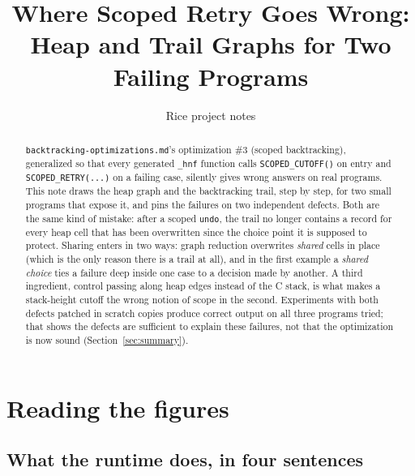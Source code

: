 \documentclass[11pt]{article}
\title{Where Scoped Retry Goes Wrong:\\
Heap and Trail Graphs for Two Failing Programs}
\author{Rice project notes}
\date{}
\newcommand{\btomd}{\texttt{backtracking-\allowbreak optimizations.md}\xspace}
\newcommand{\code}[1]{\texttt{#1}}
\begin{document}
\maketitle

\begin{abstract}
\btomd's optimization \#3 (scoped backtracking), generalized so that every
generated \code{\_hnf} function calls \code{SCOPED\_CUTOFF()} on entry and
\code{SCOPED\_RETRY(...)} on a failing case, silently gives wrong answers on
real programs. This note draws the heap graph and the backtracking trail,
step by step, for two small programs that expose it, and pins the failures on
two independent defects. Both are the same kind of mistake: after a scoped
\code{undo}, the trail no longer contains a record for every heap cell that
has been overwritten since the choice point it is supposed to protect. Sharing
enters in two ways: graph reduction overwrites \emph{shared} cells in place
(which is the only reason there is a trail at all), and in the first example
a \emph{shared choice} ties a failure deep inside one case to a decision made
by another. A third ingredient, control passing along heap edges instead of
the C stack, is what makes a stack-height cutoff the wrong notion of scope in
the second. Experiments with both defects patched in scratch
copies produce correct output on all three programs tried; that shows the
defects are sufficient to explain these failures, not that the optimization is
now sound (Section~\ref{sec:summary}).
\end{abstract}

\section{Reading the figures}

\subsection{What the runtime does, in four sentences}
\end{document}
